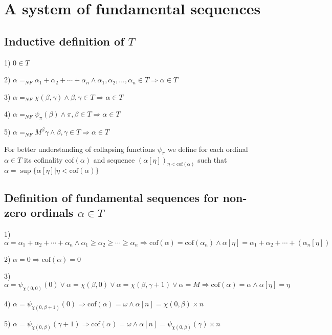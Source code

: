 \documentclass[10pt]{article}
\begin{document}
\section{A system of fundamental sequences}

\subsection{Inductive definition of \(T\)}

1) \(0 \in T\)

2) \(\alpha=_{NF}\alpha_1+\alpha_2+\cdots+\alpha_n\wedge\alpha_1,\alpha_2,...,\alpha_n\in T\Rightarrow\alpha\in T\)

3) \(\alpha=_{NF}\chi(\beta,\gamma)\wedge\beta,\gamma\in T\Rightarrow\alpha\in T\)

4) \(\alpha=_{NF}\psi_\pi(\beta)\wedge\pi,\beta\in T\Rightarrow\alpha\in T\)

5) \(\alpha=_{NF}M^\beta\gamma\wedge\beta,\gamma\in T\Rightarrow\alpha\in T\)

For better understanding of collapsing functions \(\psi_\pi\) we define for each ordinal  \(\alpha\in T\)  its cofinality \(\text{cof}(\alpha) \) and  sequence   \( (\alpha[\eta])_{\eta<\text{cof}(\alpha) }\)  such that \(\alpha=\sup\{\alpha[\eta]|\eta<\text{cof}(\alpha) \}\)

\subsection{Definition of fundamental sequences for non-zero ordinals \(\alpha\in T\)}

1) \(\alpha=\alpha_1+\alpha_2+\cdots+\alpha_n \wedge \alpha_1\geq\alpha_2\geq\cdots\geq\alpha_n \Rightarrow \text{cof} (\alpha)= \text{cof} (\alpha_n) \wedge \alpha[\eta]=\alpha_1+\alpha_2+\cdots+(\alpha_n[\eta])\)

2) \(\alpha=0\Rightarrow\text{cof}(\alpha)=0\) 

\bigskip

3) \(\alpha=\psi _{\chi(0,0)}(0) \vee \alpha=\chi(\beta,0) \vee \alpha=\chi(\beta,\gamma+1) \vee \alpha=M\Rightarrow \text{cof} (\alpha)=\alpha \wedge \alpha[\eta]=\eta\)

4) \(\alpha=\psi _{\chi(0,\beta+1)}(0) \Rightarrow \text{cof}(\alpha)=\omega \wedge \alpha[n]=\chi(0,\beta)\times n\)

5) \(\alpha=\psi_{ \chi(0,\beta)}(\gamma+1) \Rightarrow \text{cof}(\alpha)=\omega \wedge \alpha[n]=\psi_{\chi(0,\beta)}(\gamma)\times n\)
\end{document}
